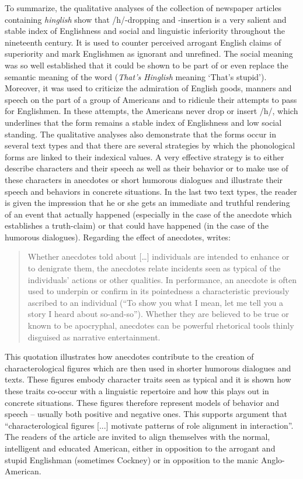To summarize, the qualitative analyses of the collection of newspaper articles containing \emph{hinglish} show that /h/-dropping and -insertion is a very salient and stable index of Englishness and social and linguistic inferiority throughout the nineteenth century. It is used to counter perceived arrogant English claims of superiority and mark Englishmen as ignorant and unrefined. The social meaning was so well established that it could be shown to be part of or even replace the semantic meaning of the word (\emph{That’s Hinglish} meaning ‘That’s stupid’). Moreover, it was used to criticize the admiration of English goods, manners and speech on the part of a group of Americans and to ridicule their attempts to pass for Englishmen. In these attempts, the Americans never drop or insert /h/, which underlines that the form remains a stable index of Englishness and low social standing. The qualitative analyses also demonstrate that the forms occur in several text types and that there are several strategies by which the phonological forms are linked to their indexical values. A very effective strategy is to either describe characters and their speech as well as their behavior or to make use of these characters in anecdotes or short humorous dialogues and illustrate their speech and behaviors in concrete situations. In the last two text types, the reader is given the impression that he or she gets an immediate and truthful rendering of an event that actually happened (especially in the case of the anecdote which establishes a truth-claim) or that could have happened (in the case of the humorous dialogues). Regarding the effect of anecdotes, \citet[73--74]{Nicolaisen2011} writes:

\begin{quote}
Whether anecdotes told about […] individuals are intended to enhance or to denigrate them, the anecdotes relate incidents seen as typical of the individuals’ actions or other qualities. In performance, an anecdote is often used to underpin or confirm in its pointedness a characteristic previously ascribed to an individual (“To show you what I mean, let me tell you a story I heard about so-and-so”). Whether they are believed to be true or known to be apocryphal, anecdotes can be powerful rhetorical tools thinly disguised as narrative entertainment.
\end{quote}


This quotation illustrates how anecdotes contribute to the creation of characterological figures which are then used in shorter humorous dialogues and texts. These figures embody character traits seen as typical and it is shown how these traits co-occur with a linguistic repertoire and how this plays out in concrete situations. These figures therefore represent models of behavior and speech – usually both positive and negative ones. This supports  argument that “characterological figures [...] motivate patterns of role alignment in interaction”. The readers of the article are invited to align themselves with the normal, intelligent and educated American, either in opposition to the arrogant and stupid Englishman (sometimes Cockney) or in opposition to the manic Anglo-American.


